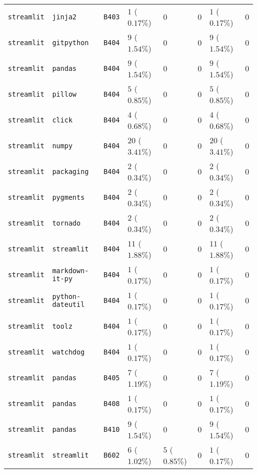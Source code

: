 \begin{table}
\begin{tabular}{llllllll}
\texttt{streamlit} & \texttt{jinja2} & \texttt{B403} & $1$ ($0.17\%$) & $0$ & $0$ & $1$ ($0.17\%$) & $0$ \\
\texttt{streamlit} & \texttt{gitpython} & \texttt{B404} & $9$ ($1.54\%$) & $0$ & $0$ & $9$ ($1.54\%$) & $0$ \\
\texttt{streamlit} & \texttt{pandas} & \texttt{B404} & $9$ ($1.54\%$) & $0$ & $0$ & $9$ ($1.54\%$) & $0$ \\
\texttt{streamlit} & \texttt{pillow} & \texttt{B404} & $5$ ($0.85\%$) & $0$ & $0$ & $5$ ($0.85\%$) & $0$ \\
\texttt{streamlit} & \texttt{click} & \texttt{B404} & $4$ ($0.68\%$) & $0$ & $0$ & $4$ ($0.68\%$) & $0$ \\
\texttt{streamlit} & \texttt{numpy} & \texttt{B404} & $20$ ($3.41\%$) & $0$ & $0$ & $20$ ($3.41\%$) & $0$ \\
\texttt{streamlit} & \texttt{packaging} & \texttt{B404} & $2$ ($0.34\%$) & $0$ & $0$ & $2$ ($0.34\%$) & $0$ \\
\texttt{streamlit} & \texttt{pygments} & \texttt{B404} & $2$ ($0.34\%$) & $0$ & $0$ & $2$ ($0.34\%$) & $0$ \\
\texttt{streamlit} & \texttt{tornado} & \texttt{B404} & $2$ ($0.34\%$) & $0$ & $0$ & $2$ ($0.34\%$) & $0$ \\
\texttt{streamlit} & \texttt{streamlit} & \texttt{B404} & $11$ ($1.88\%$) & $0$ & $0$ & $11$ ($1.88\%$) & $0$ \\
\texttt{streamlit} & \texttt{markdown-it-py} & \texttt{B404} & $1$ ($0.17\%$) & $0$ & $0$ & $1$ ($0.17\%$) & $0$ \\
\texttt{streamlit} & \texttt{python-dateutil} & \texttt{B404} & $1$ ($0.17\%$) & $0$ & $0$ & $1$ ($0.17\%$) & $0$ \\
\texttt{streamlit} & \texttt{toolz} & \texttt{B404} & $1$ ($0.17\%$) & $0$ & $0$ & $1$ ($0.17\%$) & $0$ \\
\texttt{streamlit} & \texttt{watchdog} & \texttt{B404} & $1$ ($0.17\%$) & $0$ & $0$ & $1$ ($0.17\%$) & $0$ \\
\texttt{streamlit} & \texttt{pandas} & \texttt{B405} & $7$ ($1.19\%$) & $0$ & $0$ & $7$ ($1.19\%$) & $0$ \\
\texttt{streamlit} & \texttt{pandas} & \texttt{B408} & $1$ ($0.17\%$) & $0$ & $0$ & $1$ ($0.17\%$) & $0$ \\
\texttt{streamlit} & \texttt{pandas} & \texttt{B410} & $9$ ($1.54\%$) & $0$ & $0$ & $9$ ($1.54\%$) & $0$ \\
\texttt{streamlit} & \texttt{streamlit} & \texttt{B602} & $6$ ($1.02\%$) & $5$ ($0.85\%$) & $0$ & $1$ ($0.17\%$) & $0$ \\

\end{tabular}
\end{table}

